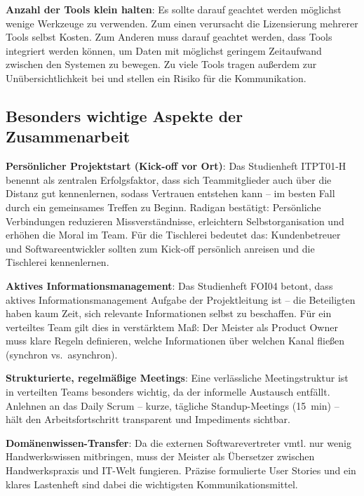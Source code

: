 \documentclass[
    a4paper,
    11pt,
    bibliography=totoc,
    listof=totoc,
    parskip=half,
    headings=normal
]{scrbook}
\begin{document}
\textbf{Anzahl der Tools klein halten}: Es sollte darauf geachtet werden möglichst wenige Werkzeuge zu verwenden.
Zum einen verursacht die Lizensierung mehrerer Tools selbst Kosten. Zum Anderen muss darauf geachtet werden, dass
Tools integriert werden können, um Daten mit möglichst geringem Zeitaufwand zwischen den Systemen zu bewegen.
Zu viele Tools tragen außerdem zur Unübersichtlichkeit bei und stellen ein Risiko für die Kommunikation.


\subsection{Besonders wichtige Aspekte der Zusammenarbeit}

\label{sec:Projektstart}
\textbf{Persönlicher Projektstart (Kick-off vor Ort)}: Das Studienheft ITPT01-H
benennt als zentralen Erfolgsfaktor, dass sich Teammitglieder auch über die
Distanz gut kennenlernen, sodass Vertrauen entstehen kann -- im besten Fall
durch ein gemeinsames Treffen zu Beginn\autocite[vgl.][Kap.~5]{Reppin2020}. Radigan\autocite{Radigan2023} bestätigt: Persönliche
Verbindungen reduzieren Missverständnisse, erleichtern Selbstorganisation und
erhöhen die Moral im Team. Für die Tischlerei bedeutet das: Kundenbetreuer
und Softwareentwickler sollten zum Kick-off persönlich anreisen und die
Tischlerei kennenlernen.

\textbf{Aktives Informationsmanagement}: Das Studienheft FOI04 betont, dass
aktives Informationsmanagement Aufgabe der Projektleitung ist -- die Beteiligten
haben kaum Zeit, sich relevante Informationen selbst zu beschaffen\autocite[vgl.][Kap.~2]{Kiefer2010}. Für ein verteiltes Team gilt dies in
verstärktem Maß: Der Meister als Product Owner muss klare Regeln definieren,
welche Informationen über welchen Kanal fließen (synchron vs.\ asynchron).

\textbf{Strukturierte, regelmäßige Meetings}: Eine verlässliche Meetingstruktur
ist in verteilten Teams besonders wichtig, da der informelle Austausch entfällt.
Anlehnen an das Daily Scrum -- kurze, tägliche Standup-Meetings (15~min) -- hält
den Arbeitsfortschritt transparent und Impediments sichtbar\autocite[vgl.][Kap.~5]{Reppin2020}.

\textbf{Domänenwissen-Transfer}: Da die externen Softwarevertreter vmtl. nur wenig
Handwerkswissen mitbringen, muss der Meister als Übersetzer zwischen
Handwerkspraxis und IT-Welt fungieren. Präzise formulierte User Stories und ein
klares Lastenheft sind dabei die wichtigsten Kommunikationsmittel.
\end{document}

